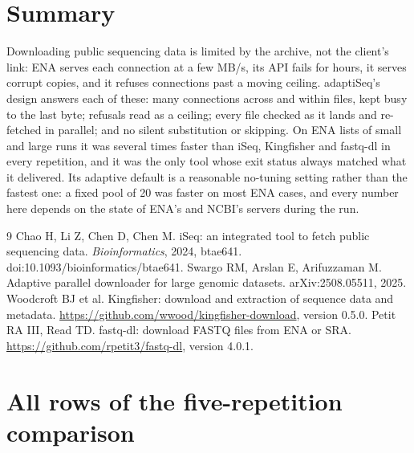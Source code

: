 \documentclass[11pt,a4paper]{article}
\begin{document}
\section{Summary}
Downloading public sequencing data is limited by the archive, not the client's link: ENA serves each connection at a few
MB/s, its API fails for hours, it serves corrupt copies, and it refuses connections past a moving ceiling. adaptiSeq's design
answers each of these: many connections across and within files, kept busy to the last byte; refusals read as a ceiling;
every file checked as it lands and re-fetched in parallel; and no silent substitution or skipping. On ENA lists of small and
large runs it was several times faster than iSeq, Kingfisher and fastq-dl in every repetition, and it was the only tool whose
exit status always matched what it delivered. Its adaptive default is a reasonable no-tuning setting rather than the fastest
one: a fixed pool of 20 was faster on most ENA cases, and every number here depends on the state of ENA's and NCBI's servers
during the run.

\begin{thebibliography}{9}\small
{} Chao H, Li Z, Chen D, Chen M. iSeq: an integrated tool to fetch public sequencing data.
\emph{Bioinformatics}, 2024, btae641. doi:10.1093/bioinformatics/btae641.
 Swargo RM, Arslan E, Arifuzzaman M. Adaptive parallel downloader for large genomic datasets.
arXiv:2508.05511, 2025.
 Woodcroft BJ et al. Kingfisher: download and extraction of sequence data and metadata.
\url{https://github.com/wwood/kingfisher-download}, version 0.5.0.
 Petit RA III, Read TD. fastq-dl: download FASTQ files from ENA or SRA.
\url{https://github.com/rpetit3/fastq-dl}, version 4.0.1.
\end{thebibliography}

\appendix
\section{All rows of the five-repetition comparison}
\small
\setlength{\tabcolsep}{4pt}

\end{document}
